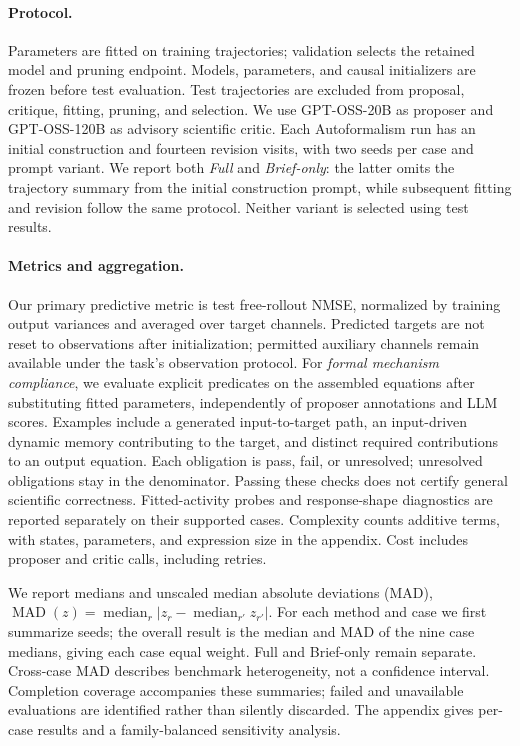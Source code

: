 \paragraph{Protocol.}
Parameters are fitted on training trajectories; validation selects the retained
model and pruning endpoint. Models, parameters, and causal initializers are
frozen before test evaluation. Test trajectories are excluded from proposal,
critique, fitting, pruning, and selection. We use GPT-OSS-20B as proposer and
GPT-OSS-120B as advisory scientific critic. Each Autoformalism run has an initial
construction and fourteen revision visits, with two seeds per case and prompt
variant. We report both \emph{Full} and \emph{Brief-only}: the latter omits the
trajectory summary from the initial construction prompt, while subsequent
fitting and revision follow the same protocol. Neither variant is selected
using test results.

\paragraph{Metrics and aggregation.}
Our primary predictive metric is test free-rollout NMSE, normalized by training
output variances and averaged over target channels. Predicted targets are not
reset to observations after initialization; permitted auxiliary channels remain
available under the task's observation protocol. For \emph{formal mechanism
compliance}, we evaluate explicit predicates on the assembled equations after
substituting fitted parameters, independently of proposer annotations and LLM
scores. Examples include a generated input-to-target path, an input-driven
dynamic memory contributing to the target, and distinct required contributions
to an output equation. Each obligation is pass, fail, or unresolved; unresolved
obligations stay in the denominator. Passing these checks does not certify
general scientific correctness. Fitted-activity probes and response-shape
diagnostics are reported separately on their supported cases. Complexity counts
additive terms, with states, parameters, and expression size in the appendix.
Cost includes proposer and critic calls, including retries.

We report medians and unscaled median absolute deviations (MAD),
$\operatorname{MAD}(z)=\operatorname{median}_r
|z_r-\operatorname{median}_{r'}z_{r'}|$.
For each method and case we first summarize seeds; the overall result is the
median and MAD of the nine case medians, giving each case equal weight.
Full and Brief-only remain separate. Cross-case MAD describes benchmark
heterogeneity, not a confidence interval. Completion coverage accompanies these summaries;
failed and unavailable evaluations are identified rather than silently discarded.
The appendix gives per-case results and a family-balanced sensitivity analysis.


